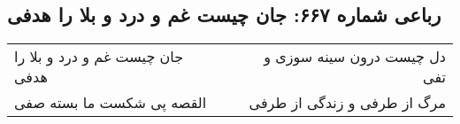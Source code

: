 \begin{center}
\section*{رباعی شماره ۶۶۷: جان چیست غم و درد و بلا را هدفی}
\label{sec:sh667}
\begin{longtable}{l p{0.5cm} r}
جان چیست غم و درد و بلا را هدفی
&&
دل چیست درون سینه سوزی و تفی
\\
القصه پی شکست ما بسته صفی
&&
مرگ از طرفی و زندگی از طرفی
\\
\end{longtable}
\end{center}
